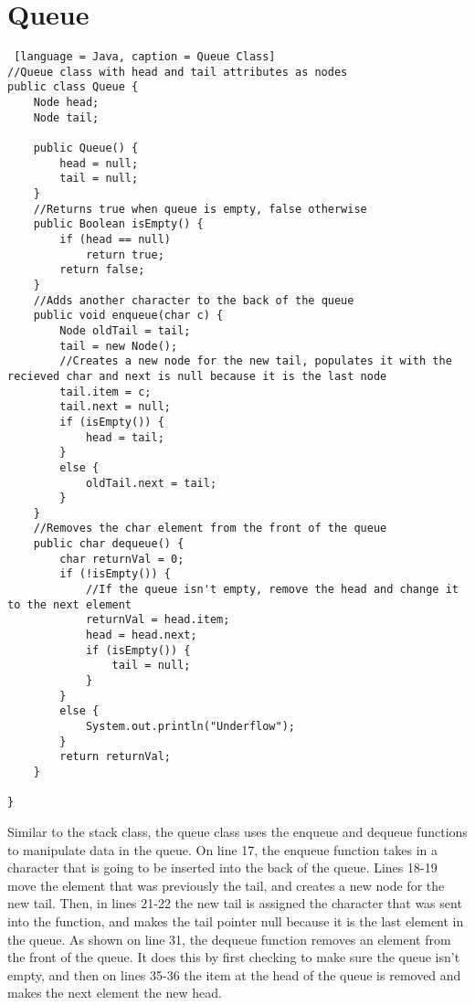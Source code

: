 \documentclass{article}
\begin{document}
\section{Queue}
\begin{lstlisting} [language = Java, caption = Queue Class]
//Queue class with head and tail attributes as nodes
public class Queue {
    Node head;
    Node tail;

    public Queue() {
        head = null;
        tail = null;
    }
    //Returns true when queue is empty, false otherwise
    public Boolean isEmpty() {
        if (head == null)
            return true;
        return false;
    }
    //Adds another character to the back of the queue
    public void enqueue(char c) {
        Node oldTail = tail;
        tail = new Node();
        //Creates a new node for the new tail, populates it with the recieved char and next is null because it is the last node
        tail.item = c;
        tail.next = null;
        if (isEmpty()) {
            head = tail;
        }
        else {
            oldTail.next = tail;
        }
    }
    //Removes the char element from the front of the queue
    public char dequeue() {
        char returnVal = 0;
        if (!isEmpty()) {
            //If the queue isn't empty, remove the head and change it to the next element
            returnVal = head.item;
            head = head.next;
            if (isEmpty()) {
                tail = null;
            }
        }
        else {
            System.out.println("Underflow");
        }
        return returnVal;
    }
    
}
\end{lstlisting}
\noindent
Similar to the stack class, the queue class uses the enqueue and dequeue functions to manipulate data in the queue. On line 17, the enqueue function takes in a character that is going to be inserted into the back of the queue. Lines 18-19 move the element that was previously the tail, and creates a new node for the new tail. Then, in lines 21-22 the new tail is assigned the character that was sent into the function, and makes the tail pointer null because it is the last element in the queue. As shown on line 31, the dequeue function removes an element from the front of the queue. It does this by first checking to make sure the queue isn't empty, and then on lines 35-36 the item at the head of the queue is removed and makes the next element the new head. 
\end{document}
